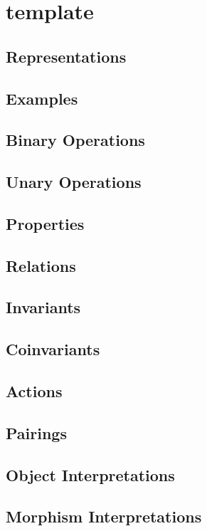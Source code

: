 \documentclass[a4paper]{amsart}
\begin{document}
\section*{template}
\subsection*{Representations}

\subsection*{Examples}

\subsection*{Binary Operations}

\subsection*{Unary Operations}

\subsection*{Properties}

\subsection*{Relations}

\subsection*{Invariants}

\subsection*{Coinvariants}

\subsection*{Actions}

\subsection*{Pairings}

\subsection*{Object Interpretations}

\subsection*{Morphism Interpretations}

\end{document}
